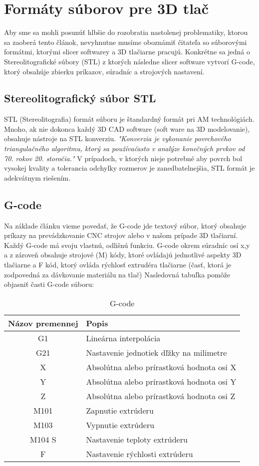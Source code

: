 \documentclass[10pt,twoside,slovak,a4paper]{article}
\begin{document}
\section{Formáty súborov pre 3D tlač}
Aby sme sa mohli posunúť hlbšie do rozobratia nastolenej problematiky, ktorou sa zaoberá tento článok, nevyhnutne musíme oboznámiť čitateľa so súborovými formátmi, ktorými slicer softwarey a 3D tlačiarne pracujú. Konkrétne sa jedná o Stereolitografické súbory (STL) z ktorých následne slicer software vytvorí G-code, ktorý obsahúje zbierku príkazov, súradníc a strojových nastavení.
\subsection{Stereolitografický súbor STL}\label{formaty:1}
\cite{2} STL (Stereolitografia) formát súboru je štandardný formát pri AM technológiách. Mnoho, ak nie dokonca každý 3D CAD software (soft ware na 3D modelovanie), obsahuje nástroje na STL konverziu.
\emph{"Konverzia je vykonanie povrchového triangulačného algoritmu, ktorý sa používačasto v analýze konečných prvkov od 70. rokov 20. storočia."}
V prípadoch, v ktorých nieje potrebné aby povrch bol vysokej kvality a tolerancia odchylky rozmerov je zanedbatelnejšia, STL formát je adekvátnym riešením.

\subsection{G-code}\label{formaty:2}
Na základe článku \cite{1} vieme povedať, že G-code jde textový súbor, ktorý obsahuje príkazy na prevádzkovanie CNC strojov alebo v našom prípade 3D tlačiarní. Každý G-code má svoju vlastnú, odlišnú funkciu. G-code okrem súradníc osí x,y a z zároveň obsahuje strojové (M) kódy, ktoré ovládajú jednotlivé aspekty 3D tlačiarne a F kód, ktorý ovláda rýchlosť extrudéra tlačiarne (časť, ktorá je zodpovedná za dávkovanie materiálu na tlač)
Nasledovná tabuľka pomôže objasniť časti G-code súboru:

\begin{table}[h]
    \centering
    \begin{tabular}{c|l}
    \textbf{Názov premennej} & \textbf{Popis} \\
    \hline
        G1 & Lineárna interpolácia   \\
        G21 & Nastavenie jednotiek dľžky na milimetre  \\
        X & Absolútna alebo prírastková hodnota osi X  \\
        Y & Absolútna alebo prírastková hodnota osi Y \\
        Z & Absolútna alebo prírastková hodnota osi Z  \\
        M101 & Zapnutie extrúderu  \\
        M103  & Vypnutie extrúderu  \\
        M104 S & Nastavenie teploty extrúderu  \\
        F & Nastavenie rýchlosti extrúderu  \\
    \end{tabular}
    \caption{G-code}
    \label{tab:my_label}
\end{table}
\end{document}
